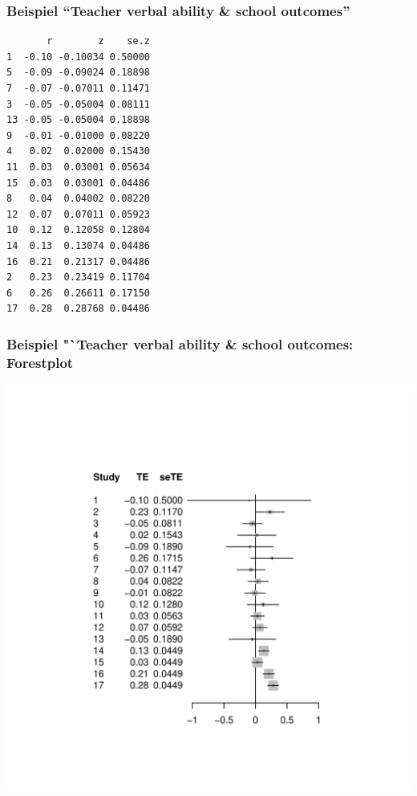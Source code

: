 \begin{frame}\frametitle{Beispiel "`Teacher verbal ability \&
    school outcomes"'}
\begin{footnotesize}
\begin{knitrout}
\color{fgcolor}\begin{kframe}
\begin{verbatim}
       r        z    se.z
1  -0.10 -0.10034 0.50000
5  -0.09 -0.09024 0.18898
7  -0.07 -0.07011 0.11471
3  -0.05 -0.05004 0.08111
13 -0.05 -0.05004 0.18898
9  -0.01 -0.01000 0.08220
4   0.02  0.02000 0.15430
11  0.03  0.03001 0.05634
15  0.03  0.03001 0.04486
8   0.04  0.04002 0.08220
12  0.07  0.07011 0.05923
10  0.12  0.12058 0.12804
14  0.13  0.13074 0.04486
16  0.21  0.21317 0.04486
2   0.23  0.23419 0.11704
6   0.26  0.26611 0.17150
17  0.28  0.28768 0.04486
\end{verbatim}
\end{kframe}
\end{knitrout}

\end{footnotesize}
\citep[Quelle: ]{aloe_teacher_2009}
\end{frame}


\begin{frame}[fragile, shrink=15, plain]\frametitle{Beispiel "`Teacher verbal
    ability \& school outcomes: Forestplot}

\begin{knitrout}
\color{fgcolor}
\includegraphics[width=\textwidth]{fig/forestverbab} 

\end{knitrout}

\end{frame}




